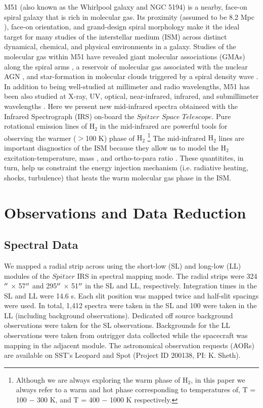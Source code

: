 \documentclass[manuscript]{aastex}
\begin{document}
M51 (also known as the Whirlpool galaxy and NGC 5194) is a nearby,
face-on spiral galaxy that is rich in molecular gas.  Its proximity
(assumed to be 8.2 Mpc \citep{tul88}), face-on orientation, and
grand-design spiral morphology make it the ideal target for many
studies of the interstellar medium (ISM) across distinct dynamical,
chemical, and physical environments in a galaxy.  Studies of the
molecular gas within M51 have revealed giant molecular associations
(GMAs) along the spiral arms \citep{aal99}, a reservoir of molecular
gas associated with the nuclear AGN \citep{sco98}, and star-formation
in molecular clouds triggered by a spiral density wave \citep{vog88}.
In addition to being well-studied at millimeter and radio wavelengths,
M51 has been also studied at X-ray, UV, optical, near-infrared,
infrared, and submillimeter wavelengths \citep{pal85,ter01, sco01,
  cal05, mat04}.  Here we present new mid-infrared spectra obtaineed
with the Infrared Spectrograph (IRS) \citep{hou04} on-board the
$Spitzer$ $Space$ $Telescope$.  Pure rotational emission lines of
$\mathrm{H_2}$ in the mid-infrared are powerful tools for observing
the warmer ($>$100 K) phase of $\mathrm{H_2}$ \footnote{Although we
  are always exploring the warm phase of $\mathrm{H_2}$, in this paper
  we always refer to a warm and hot phase corresponding to
  temperatures of, T = 100 $-$ 300 K, and T = 400 $-$ 1000 K
  respectively.}  The mid-infrared $\mathrm{H_2}$ lines are important
diagnostics of the ISM because they allow us to model the
$\mathrm{H_2}$ excitation-temperature, mass \citep{rig02, hig06}, and
ortho-to-para ratio \citep{neu98, neu06}.  These quantitites, in turn,
help us constraint the energy injection mechanism (i.e. radiative
heating, shocks, turbulence) that heats the warm molecular gas phase
in the ISM.

\section{Observations and Data Reduction}

\subsection{Spectral Data}

We mapped a radial strip across  using the short-low
(SL) and long-low (LL) modules of the $Spitzer$ IRS in spectral
mapping mode.  The radial strips were 324$\mbox{$^{\prime\prime}$}$ $\times$
57$\mbox{$^{\prime\prime}$}$ and 295$\mbox{$^{\prime\prime}$}$ $\times$ 51$\mbox{$^{\prime\prime}$}$ in the SL and LL,
respectively.  Integration times in the SL and LL were 14.6 s.  Each
slit position was mapped twice and half-slit spacings were used.  In
total, 1,412 spectra were taken in the SL and 100 were taken in the LL
(including background observations).  Dedicated off source background
observations were taken for the SL observations.  Backgrounds for the
LL observations were taken from outrigger data collected while the
spacecraft was mapping in the adjacent module.  The astronomical
observation requests (AORs) are available on SST's Leopard and Spot
(Project ID 200138, PI: K. Sheth).
\end{document}

